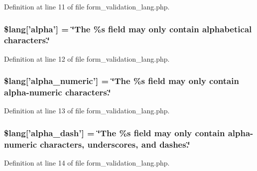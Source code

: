 Definition at line 11 of file form\-\_\-validation\-\_\-lang.\-php.

\hypertarget{form__validation__lang_8php_aa49612ba8d03053d7d0b71cceb076758}{
\subsubsection[{\$lang}]{\setlength{\rightskip}{0pt plus 5cm}\$lang\mbox{[}'{\bf alpha}'\mbox{]} = \char`\"{}The \%s field may only contain alphabetical characters.\char`\"{}}}\label{form__validation__lang_8php_aa49612ba8d03053d7d0b71cceb076758}


Definition at line 12 of file form\-\_\-validation\-\_\-lang.\-php.

\hypertarget{form__validation__lang_8php_a65ae3b2624bdea4b04ab5cf4a508f64e}{
\subsubsection[{\$lang}]{\setlength{\rightskip}{0pt plus 5cm}\$lang\mbox{[}'alpha\-\_\-numeric'\mbox{]} = \char`\"{}The \%s field may only contain {\bf alpha}-\/numeric characters.\char`\"{}}}\label{form__validation__lang_8php_a65ae3b2624bdea4b04ab5cf4a508f64e}


Definition at line 13 of file form\-\_\-validation\-\_\-lang.\-php.

\hypertarget{form__validation__lang_8php_aee9bc9f895ccbca30d1f6433b48a509d}{
\subsubsection[{\$lang}]{\setlength{\rightskip}{0pt plus 5cm}\$lang\mbox{[}'alpha\-\_\-dash'\mbox{]} = \char`\"{}The \%s field may only contain {\bf alpha}-\/numeric characters, underscores, {\bf and} dashes.\char`\"{}}}\label{form__validation__lang_8php_aee9bc9f895ccbca30d1f6433b48a509d}


Definition at line 14 of file form\-\_\-validation\-\_\-lang.\-php.

